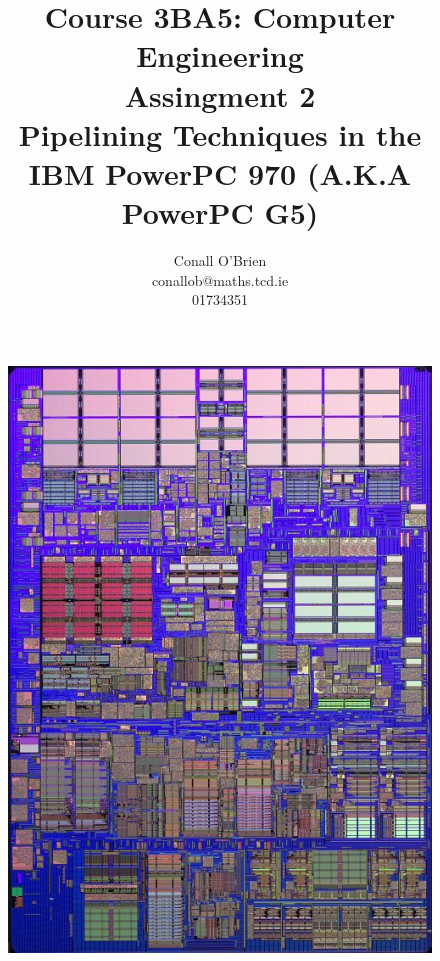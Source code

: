 \documentclass[a4paper,12pt]{article}
\begin{document}
\title{Course 3BA5: Computer Engineering \\ Assingment 2 \\ Pipelining
Techniques in the \\ IBM PowerPC 970 (A.K.A PowerPC G5)}

\author{Conall O'Brien \\ conallob@maths.tcd.ie \\ 01734351}

\maketitle

\begin{figure}[hb]

\begin{center}

\includegraphics{powerpc970-1.png}

\end{center}

\caption{\cite[The IBM PowerPC 970 Microprocessor Unit]{a10}}

\end{figure}
\end{document}
